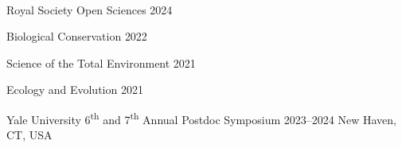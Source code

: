 \\





\begin{cvhonors}
  \mycvhonor
    {Royal Society Open Sciences} %
    {} %
    {2024} %

  \mycvhonor
    {Biological Conservation} %
    {} %
    {2022} %

  \mycvhonor
    {Science of the Total Environment} %
    {} %
    {2021} %

  \mycvhonor
    {Ecology and Evolution} %
    {} %
    {2021} %
\end{cvhonors}


\begin{cventries}
  \cventry
    {Yale University} %
    {6\textsuperscript{th} and 7\textsuperscript{th} Annual Postdoc Symposium} %
    {2023--2024} %
    {New Haven, CT, USA} %
    {}
\end{cventries}


